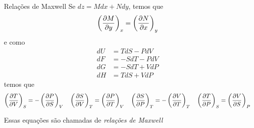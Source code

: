 \documentclass[t,%
brazilian,%
11pt,%
aspectratio=169,%
table%
]{beamer}
\begin{document}
 \begin{frame}{Relações de Maxwell}
     Se \(dz = M dx + N dy\), temos que
     \[
         \left(\frac{\partial M}{\partial y}\right)_x = \left(\frac{\partial N}{\partial x}\right)_y
     \]
     e como
     \begin{align*}
         dU &= TdS - PdV \\
         dF &=  -SdT - PdV \\
         dG &=  -SdT + VdP \\
         dH &= TdS + VdP
     \end{align*}
     temos que
     \[
         \left(\frac{\partial T}{\partial V}\right)_S = - \left(\frac{\partial P}{\partial S}\right)_V \quad
         \left(\frac{\partial S}{\partial V}\right)_T = \left(\frac{\partial P}{\partial T}\right)_V \quad
         \left(\frac{\partial S}{\partial P}\right)_T = -\left(\frac{\partial V}{\partial T}\right)_T \quad
         \left(\frac{\partial T}{\partial P}\right)_S = \left(\frac{\partial V}{\partial S}\right)_P
     \]

     Essas equações são chamadas de \textit{relações de Maxwell}


 \end{frame}

\end{document}

